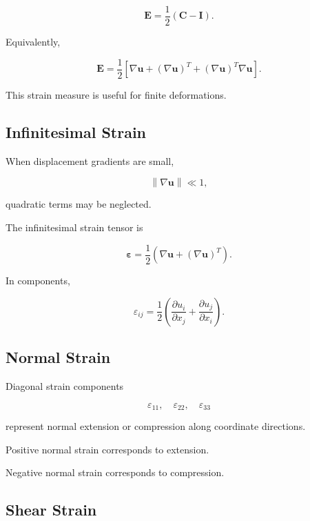 \[
\boxed{
\mathbf{E}
=
\frac12
\left(
\mathbf{C}-\mathbf{I}
\right).
}
\]

Equivalently,

\[
\boxed{
\mathbf{E}
=
\frac12
\left[
\nabla\mathbf{u}
+
(\nabla\mathbf{u})^T
+
(\nabla\mathbf{u})^T\nabla\mathbf{u}
\right].
}
\]

This strain measure is useful for finite deformations.

\subsection{Infinitesimal Strain}
\label{subsec:infinitesimal-strain}

When displacement gradients are small,

\[
\left\|
\nabla\mathbf{u}
\right\|
\ll1,
\]

quadratic terms may be neglected.

The infinitesimal strain tensor is

\[
\boxed{
\boldsymbol{\varepsilon}
=
\frac12
\left(
\nabla\mathbf{u}
+
(\nabla\mathbf{u})^T
\right).
}
\]

In components,

\[
\boxed{
\varepsilon_{ij}
=
\frac12
\left(
\frac{\partial u_i}{\partial x_j}
+
\frac{\partial u_j}{\partial x_i}
\right).
}
\]

\subsection{Normal Strain}
\label{subsec:normal-strain}

Diagonal strain components

\[
\boxed{
\varepsilon_{11},
\quad
\varepsilon_{22},
\quad
\varepsilon_{33}
}
\]

represent normal extension or compression along coordinate directions.

Positive normal strain corresponds to extension.

Negative normal strain corresponds to compression.

\subsection{Shear Strain}
\label{subsec:shear-strain}

